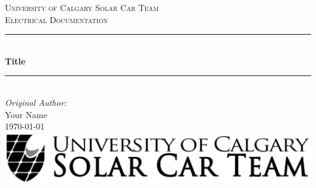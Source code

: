   \begin{titlepage}
  
    \newcommand{\HRule}{\rule{\linewidth}{0.5mm}} %
    
    \center %
     
    
    \textsc{\LARGE University of Calgary Solar Car Team}\\[1.5cm] %
    \textsc{\Large Electrical Documentation}\\[0.5cm] %
    
    
    \HRule \\[0.4cm]
      { \huge \bfseries Title}\\[0.4cm] %
    \HRule \\[1.5cm]
     
    
    \Large \emph{Original Author:}\\
    Your Name \\[3cm] %
    
    
    {\large \today}\\[2cm] %
    
    
    \includegraphics[width=\textwidth]{../../Images/Logos/logo-wide.png}\\[1cm] %
     

\end{titlepage}
